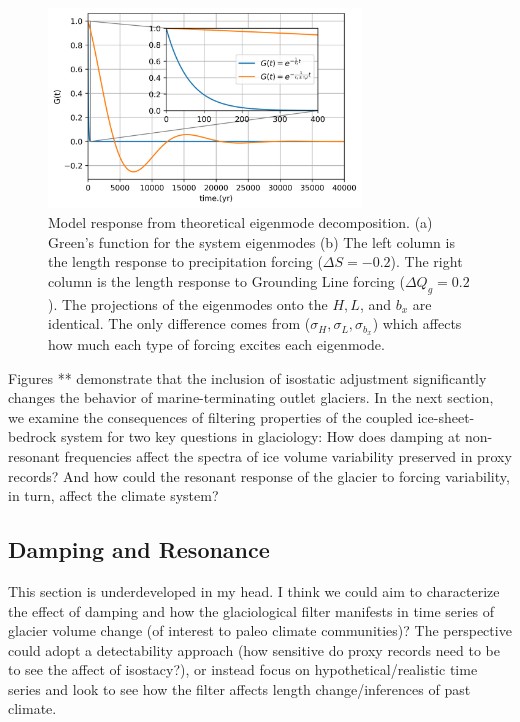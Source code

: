 \documentclass[tc, manuscript]{copernicus}
\begin{document}
\begin{figure}[t]
\includegraphics[width=8.3cm]{../figures/greens_function.png}
\caption{Model response from theoretical eigenmode decomposition. (a) Green's function for the system eigenmodes (b)
The left column is the length response to precipitation forcing ($\Delta S = −0.2$). 
The right column is the length response to Grounding Line forcing ($\Delta Q_g = 0.2$).
The projections of the eigenmodes onto the $H, L$, and $b_x$ are identical. The only difference comes from ($\sigma_H, \sigma_L, \sigma_{b_x}$) which affects how much each type of forcing excites each eigenmode.}
\end{figure}



Figures ** demonstrate that the inclusion of isostatic adjustment significantly changes the behavior of marine-terminating outlet glaciers. 
In the next section, we examine the consequences of filtering properties of the coupled ice-sheet-bedrock system for two key questions in glaciology: 
How does damping at non-resonant frequencies affect the spectra of ice volume variability preserved in proxy records?
And how could the resonant response of the glacier to forcing variability, in turn, affect the climate system?


\subsection{Damping and Resonance}

This section is underdeveloped in my head. I think we could aim to characterize the effect of damping and how the glaciological filter manifests in time series of glacier volume change (of interest to paleo climate communities)? The perspective could adopt a detectability approach (how sensitive do proxy records need to be to see the affect of isostacy?), or instead focus on hypothetical/realistic time series and look to see how the filter affects length change/inferences of past climate.
\end{document}
